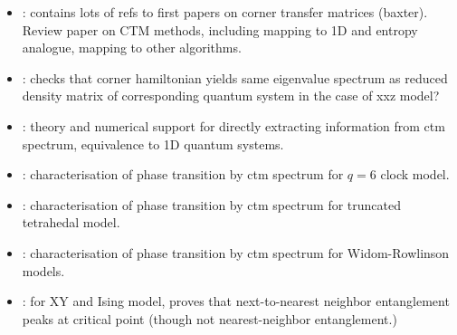 \begin{itemize}
  \item \cite{orus2012exploring}: contains lots of refs to first papers on corner transfer matrices (baxter).
  Review paper on CTM methods, including mapping to 1D and entropy analogue, mapping to other algorithms.
  \item \cite{okunishi2005real}: checks that corner hamiltonian yields same eigenvalue spectrum as reduced
  density matrix of corresponding quantum system in the case of xxz model?
  \item \cite{huang2017holographic}: theory and numerical support for directly extracting information from ctm spectrum,
  equivalence to 1D quantum systems.
  \item \cite{krvcmar2016phase}: characterisation of phase transition by ctm spectrum for $q = 6$ clock model.
  \item \cite{PhysRevE.94.022134}: characterisation of phase transition by ctm spectrum for truncated tetrahedal model.
  \item \cite{krvcmar2015reentrant}: characterisation of phase transition by ctm spectrum for Widom-Rowlinson models.
  \item \cite{osborne2002entanglement}: for XY and Ising model, proves that next-to-nearest neighbor entanglement peaks
  at critical point (though not nearest-neighbor entanglement.)


\end{itemize}
